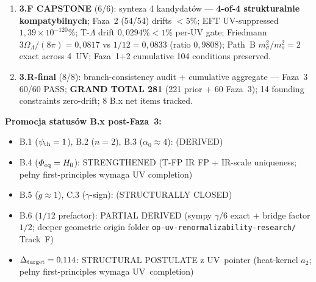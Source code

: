 \begin{remark}
\begin{enumerate}[nosep]
\begin{itemize}
        $V(\Phi_{\rm eq})|_{\beta=\gamma} = \gamma/6$ exact dla
        $V(\Phi) = \tfrac{\beta}{2}\Phi^2 - \tfrac{\gamma}{3}\Phi^3$
        ($\beta = \gamma$ vacuum, $\Phi_{\rm eq} = 1$); bridge
        $1/6 \to 1/12$ przez Path~B kinetic-norm/path-integral measure
        factor $1/2$ (sympy $1/6 \cdot 1/2 = 1/12$ exact).
      \item \textbf{B.4 STRENGTHENED}: T-FP IR fixed point (12/12 POSITIVE)
        + IR-scale uniqueness ($M_{\rm Pl}$ wykluczony przez separacj\k{e}
        $60{,}93$~dex; multi-$\Phi$ wykluczony przez single-$\Phi$ axiom).
      \item \textbf{$\Delta_{\rm target} = 0{,}114$ STRUCTURAL POSTULATE z UV~PTR}:
        heat-kernel $a_2$ frame (Birrell-Davies 1982; Avramidi 2000);
        $a_2 \supset \tfrac{1}{2}V''^2$ na M9.1$''$~FRW; $\xi_{\rm geom} = 1{,}0$;
        $\alpha(\alpha-1) = 2$ ($K_{\rm geo}\varphi^4$, $\alpha = 2$).
    \end{itemize}
  \item \textbf{3.F CAPSTONE} (6/6): synteza 4 kandydat\'ow ---
    \textbf{4-of-4 strukturalnie kompatybilnych}; Faza~2 (54/54) drifts
    $< 5\%$; EFT UV-suppressed $1{,}39 \times 10^{-120}\%$; T-$\Lambda$
    drift $0{,}0294\% < 1\%$ per-UV gate; Friedmann
    $3\Omega_\Lambda/(8\pi) = 0{,}0817$ vs $1/12 = 0{,}0833$ (ratio
    $0{,}9808$); Path~B $m_\sigma^2/m_s^2 = 2$ exact across 4~UV;
    Faza~1+2 cumulative 104 conditions preserved.
  \item \textbf{3.R-final} (8/8): branch-consistency audit + cumulative aggregate
    --- Faza~3 60/60 PASS; \textbf{GRAND TOTAL 281} (221 prior + 60 Faza~3);
    14 founding constraints zero-drift; 8 B.x net items tracked.
\end{enumerate}

\medskip
\noindent\textbf{Promocja status\'ow B.x post-Faza~3:}
\begin{itemize}\itemsep0pt
  \item B.1 ($\psi_{\rm th} = 1$), B.2 ($n = 2$), B.3 ($\alpha_0 \approx 4$):
     (DERIVED)
  \item B.4 ($\Phi_{\rm eq} = H_0$):  STRENGTHENED
    (T-FP IR FP + IR-scale uniqueness; pe\l{}ny first-principles wymaga UV completion)
  \item B.5 ($\widetilde g \approx 1$), C.3 ($\gamma$-sign):
     (STRUCTURALLY CLOSED)
  \item B.6 ($1/12$ prefactor):  PARTIAL DERIVED
    (sympy $\gamma/6$ exact + bridge factor $1/2$; deeper geometric origin folder
    \texttt{op-uv-renormalizability-research/} Track~F)
  \item $\Delta_{\rm target} = 0{,}114$:  STRUCTURAL POSTULATE
    z UV~pointer (heat-kernel $a_2$; pe\l{}ny first-principles wymaga UV~completion)
\end{itemize}


\end{remark}

